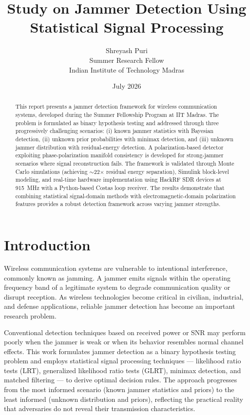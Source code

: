 \documentclass{article}
\title{Study on Jammer Detection Using Statistical Signal Processing}
\author{Shreyash Puri \\ Summer Research Fellow \\ Indian Institute of Technology Madras}
\date{July 2026}
\begin{document}
\maketitle

\begin{abstract}
This report presents a jammer detection framework for wireless communication systems, developed during the Summer Fellowship Program at IIT Madras. The problem is formulated as binary hypothesis testing and addressed through three progressively challenging scenarios: (i) known jammer statistics with Bayesian detection, (ii) unknown prior probabilities with minimax detection, and (iii) unknown jammer distribution with residual-energy detection. A polarization-based detector exploiting phase-polarization manifold consistency is developed for strong-jammer scenarios where signal reconstruction fails. The framework is validated through Monte Carlo simulations (achieving $\sim$22$\times$ residual energy separation), Simulink block-level modeling, and real-time hardware implementation using HackRF SDR devices at 915~MHz with a Python-based Costas loop receiver. The results demonstrate that combining statistical signal-domain methods with electromagnetic-domain polarization features provides a robust detection framework across varying jammer strengths.
\end{abstract}

\newpage
\tableofcontents

\newpage

\newpage

\section{Introduction}

Wireless communication systems are vulnerable to intentional interference, commonly known as jamming. A jammer emits signals within the operating frequency band of a legitimate system to degrade communication quality or disrupt reception. As wireless technologies become critical in civilian, industrial, and defense applications, reliable jammer detection has become an important research problem.

Conventional detection techniques based on received power or SNR may perform poorly when the jammer is weak or when its behavior resembles normal channel effects. This work formulates jammer detection as a binary hypothesis testing problem and employs statistical signal processing techniques — likelihood ratio tests (LRT), generalized likelihood ratio tests (GLRT), minimax detection, and matched filtering — to derive optimal decision rules. The approach progresses from the most informed scenario (known jammer statistics and priors) to the least informed (unknown distribution and priors), reflecting the practical reality that adversaries do not reveal their transmission characteristics.
\end{document}
